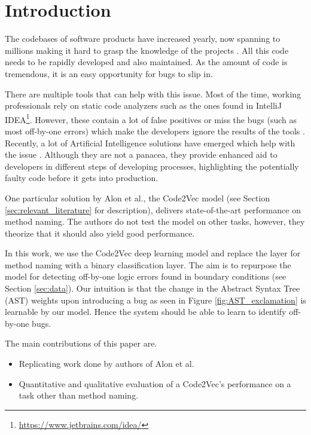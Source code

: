 \section{Introduction}
The codebases of software products have increased yearly, now spanning to millions making it hard to grasp the knowledge of the projects \cite{mcmillan2013portfolio}. All this
code needs to be rapidly developed and also maintained. As the amount of code is tremendous, it is an easy opportunity for bugs to slip in.

There are multiple tools that can help with this issue. Most of the time, working professionals rely on static code analyzers such as the ones found in IntelliJ IDEA\footnote{\url{https://www.jetbrains.com/idea/}}. However, these contain a lot of false positives or miss the bugs (such as most off-by-one errors) which make the developers ignore the results of the tools \cite{goseva2015capability}. Recently, a lot of Artificial Intelligence solutions have emerged which help with the issue \cite{alon2019code2vec, pradel2018deepbugs, allamanis2017learning, vasic2019neural}. Although they are not a panacea, they provide enhanced aid to developers in different steps of developing processes, highlighting the potentially faulty code before it gets into production.

One particular solution by Alon et al., the Code2Vec model \cite{alon2019code2vec} (see Section \ref{sec:relevant_literature} for description), delivers state-of-the-art performance on method naming. The authors do not test the model on other tasks, however, they theorize that it should also yield good performance. 

In this work, we use the Code2Vec deep learning model and replace the layer for method naming with a binary classification layer. The aim is to repurpose the model for detecting off-by-one logic errors found in boundary conditions (see Section \ref{sec:data}). Our intuition is that the change in the Abstract Syntax Tree (AST) weights upon introducing a bug as seen in Figure \ref{fig:AST_exclamation} is learnable by our model. Hence the system should be able to learn to identify off-by-one bugs.

The main contributions of this paper are.
\begin{itemize}
    \item Replicating work done by authors of Alon et al. \cite{alon2019code2vec}
    \item Quantitative and qualitative evaluation of a Code2Vec's performance on a task other than method naming.
\end{itemize}

